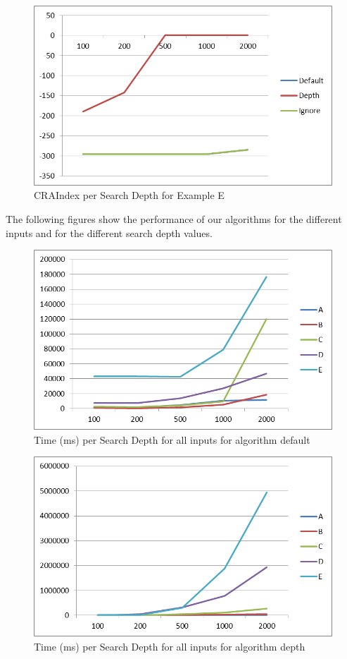 \documentclass[submission,copyright,creativecommons]{eptcs}
\begin{document}
\begin{figure}[H] \centering
	\includegraphics[width=0.8\linewidth]{Diagramme-Dateien/image007.png}
 \caption{CRAIndex per Search Depth for Example E}
 \label{fig:CRAByDepthE}
\end{figure}

The following figures show the performance of our algorithms for the different inputs and 
for the different search depth values.  

\begin{figure}[H] \centering
	\includegraphics[width=0.8\linewidth]{Diagramme2-Dateien/image009.png}
 \caption{Time (ms) per Search Depth for all inputs for algorithm default}
 \label{fig:TimeByDefault}
\end{figure}


\begin{figure}[H] \centering
	\includegraphics[width=0.8\linewidth]{Diagramme2-Dateien/image011.png}
 \caption{Time (ms) per Search Depth for all inputs for algorithm depth}
 \label{fig:TimeByDepth}
\end{figure}
\end{document}
